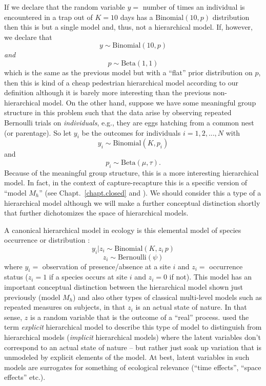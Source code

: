 If we declare that the random variable $y = $ number of times an
individual is encountered in a trap out of $K=10$ days has a
$\mbox{Binomial}(10, p)$ distribution then this is but a single model and,
thus, not a hierarchical model. If, however, we declare that
\[
y \sim \mbox{Binomial}(10,p)
\]
{\it and}
\[
p \sim \mbox{Beta}(1,1)
\]
which is the same as the previous model but with a ``flat'' prior
distribution on $p$, then this is kind of a cheap pedestrian
hierarchical model according to our definition although it is barely
more interesting than the previous non-hierarchical model.
On the
other hand, suppose we have some meaningful group structure in this
problem such that the data arise by observing repeated Bernoulli
trials on {\it individuals}, e.g., they are eggs hatching from a
common nest (or parentage). So let $y_{i}$ be the outcomes for
individuals $i=1,2,...,N$ with
\[
y_{i} \sim \mbox{Binomial}(K, p_{i})
\]
 and
\[
p_{i}\sim \mbox{Beta}(\mu, \tau).
\]
Because of the meaningful group structure, this is a more interesting
hierarchical model. In fact, in the context of capture-recapture this
is a specific version of ``model $M_h$'' (see Chapt.~\ref{chapt.closed} and
\citet{dorazio_royle:2003}).  We should consider this a type of a
hierarchical model although we will make a further conceptual
distinction shortly that further dichotomizes the space of
hierarchical models.

A canonical hierarchical model in ecology is this
elemental model of species occurrence or distribution
\citep{mackenzie_etal:2002, tyre_etal:2003, kery:2011}:
\[
y_{i}|z_{i} \sim \mbox{Binomial}(K,z_{i} \,  p)
\]
\[
z_{i} \sim \mbox{Bernoulli}(\psi)
\]
where  $y_{i} = $ observation of presence/absence at a site $i$ and
$z_{i} = $ occurrence status ($z_{i}=1$ if a species occurs at  site
$i$ and $z_{i}=0$ if not).  This model has an important conceptual
distinction between the hierarchical model shown just previously
(model $M_h$) and also other types of classical multi-level models such
as repeated measures on subjects, in that $z_{i}$ is an actual state
of nature. In that sense, $z$ is a random variable that is the outcome of a
``real'' process.   \citet{royle_dorazio:2008} used the term {\it
  explicit} hierarchical model to describe this type of model to
distinguish from hierarchical models ({\it implicit} hierarchical
models) where the latent variables don't
correspond to an actual state of nature -- but rather just soak up
variation that is unmodeled by explicit elements of the model.
At best, latent variables in such models
are surrogates for something of ecological relevance
(``time effects'', ``space effects'' etc.).


